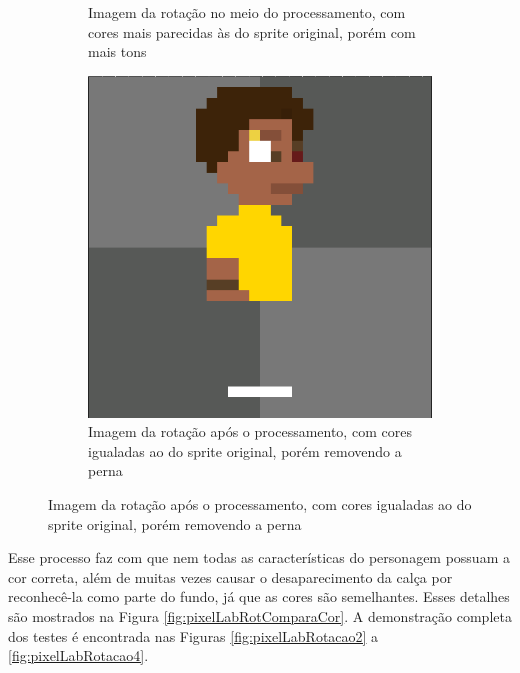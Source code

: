 \begin{figure}[htbp]
\begin{subfigure}{0.32\linewidth}
        \caption{\small Imagem da rotação no meio do processamento, com cores mais parecidas às do sprite original, porém com mais tons}
        \label{fig:pixelLabProcesso2}
    \end{subfigure}
    \begin{subfigure}{0.32\linewidth}
        \centering
        \includegraphics[width=1\linewidth]{figs/pixelLab/dia2/demonstrar_perna_sumindo.PNG}
        \caption{\small Imagem da rotação após o processamento, com cores igualadas ao do sprite original, porém removendo a perna}
        \label{fig:pixelLabProcesso3}
    \end{subfigure}

\end{figure}

Esse processo faz com que nem todas as características do personagem possuam a cor correta, além de muitas vezes causar o desaparecimento da calça por reconhecê-la como parte do fundo, já que as cores são semelhantes. Esses detalhes são mostrados na Figura \ref{fig:pixelLabRotComparaCor}. A demonstração completa dos testes é encontrada nas Figuras \ref{fig:pixelLabRotacao2} a \ref{fig:pixelLabRotacao4}.

